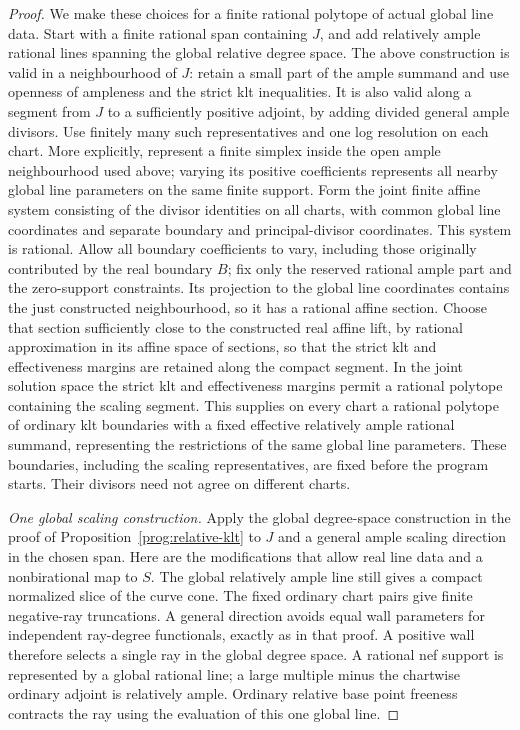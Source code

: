 \begin{proof}
We make these choices for a finite rational polytope of actual
global line data. Start with a finite rational span containing
\(J\), and add relatively ample rational lines spanning the global
relative degree space. The above construction is valid in a
neighbourhood of \(J\): retain a small part of the ample summand
and use openness of ampleness and the strict klt inequalities.
It is also valid along a segment from \(J\) to a sufficiently
positive adjoint, by adding divided general ample divisors.
Use finitely many such representatives and one log resolution on
each chart. More explicitly, represent a finite simplex inside the
open ample neighbourhood used above; varying its positive
coefficients represents all nearby global line parameters on the
same finite support. Form the joint finite affine system consisting
of the divisor identities on all charts, with common global line
coordinates and separate boundary and principal-divisor
coordinates. This system is rational. Allow all boundary
coefficients to vary, including those originally contributed by
the real boundary \(B\); fix only the reserved rational ample part
and the zero-support constraints. Its projection to the global
line coordinates contains the just constructed neighbourhood, so
it has a rational affine section. Choose that section sufficiently
close to the constructed real affine lift, by rational approximation
in its affine space of sections, so that the strict klt and
effectiveness margins are retained along the compact segment.
In the joint solution space the
strict klt and effectiveness margins permit a rational polytope
containing the scaling segment. This supplies on every chart
a rational polytope of ordinary klt boundaries with a fixed
effective relatively ample rational summand, representing the
restrictions of the same global line parameters. These boundaries,
including the scaling representatives, are fixed before the
program starts. Their divisors need not agree on different charts.

\smallskip\noindent
\emph{One global scaling construction.}
Apply the global degree-space construction in the proof of
Proposition~\ref{prog:relative-klt} to \(J\) and a general ample
scaling direction in the chosen span. Here are the modifications
that allow real line data and a nonbirational map to \(S\).
The global relatively ample line still gives a compact normalized
slice of the curve cone. The fixed ordinary chart pairs give finite
negative-ray truncations. A general direction avoids equal wall
parameters for independent ray-degree functionals, exactly as in
that proof. A positive wall therefore selects a single ray in the
global degree space. A rational nef support is represented by a
global rational line; a large multiple minus the chartwise ordinary
adjoint is relatively ample. Ordinary relative base point freeness
contracts the ray using the evaluation of this one global line.


\end{proof}
